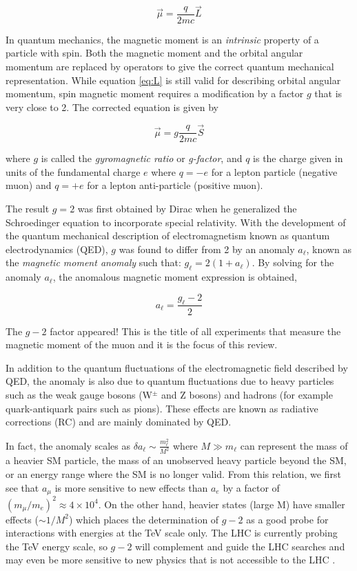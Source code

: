 \documentclass{outhesis}
\begin{document}
\begin{equation}
\overrightarrow{\mu} = \frac{q}{2mc} \overrightarrow{L}
  \label{eq:L}
\end{equation}

In quantum mechanics, the magnetic moment is an \emph{intrinsic} property of a particle with spin. Both the magnetic moment and the orbital angular momentum are replaced by operators to give the correct quantum mechanical representation. While equation \ref{eq:L} is still valid for describing orbital angular momentum, spin magnetic moment requires a modification by a factor $g$ that is very close to 2. The corrected equation is given by

\begin{equation}
\overrightarrow{\mu} = g\frac{q}{2mc}\overrightarrow{S}
\label{eq:mu}
\end{equation}

where $g$ is called the \emph{gyromagnetic ratio} or \emph{g-factor}, and $q$ is the charge given in units of the fundamental charge $e$ where $q = -e$ for a lepton particle (negative muon) and $q = +e$ for a lepton anti-particle (positive muon). 

The result $g = 2$ was first obtained by Dirac when he generalized the Schroedinger equation to incorporate special relativity. With the development of the quantum mechanical description of electromagnetism known as quantum electrodynamics (QED), $g$ was found to differ from 2 by an anomaly $a_\ell$, known as the  \emph{magnetic moment anomaly} such that: $g_\ell = 2(1+a_\ell)$. By solving for the anomaly $a_\ell$, the anomalous magnetic moment expression is obtained,

\begin{equation}
a_{\ell} = \frac{g_\ell-2}{2}
\end{equation}


The $g-2$ factor appeared! This is the title of all experiments that measure the magnetic moment of the muon and it is the focus of this review.

In addition to the quantum fluctuations of the electromagnetic field described by QED, the anomaly is also due to quantum fluctuations due to heavy particles such as the weak gauge bosons (W$^{\pm}$ and Z bosons) and hadrons (for example quark-antiquark pairs such as pions). These effects are known as radiative corrections (RC) and are mainly dominated by QED. 

In fact, the anomaly scales as $\delta a_\ell \sim \frac{m_\ell^2}{M^2}$  where $M \gg m_\ell$ can represent the mass of a heavier SM particle, the mass of an unobserved heavy particle beyond the SM, or an energy range where the SM is no longer valid. From this relation, we first see that $a_{\mu}$ is more sensitive to new effects than $a_e$ by a factor of $\left(m_{\mu}/m_e\right)^2 \approx 4 \times 10^4$. On the other hand, heavier states (large M) have smaller effects ($\sim 1/M^2$) which places the determination of $g-2$ as a good probe for interactions with energies at the TeV scale only. The LHC is currently probing the TeV energy scale, so $g-2$ will complement and guide the LHC searches and may even be more sensitive to new physics that is not accessible to the LHC \cite{doe}. 
\end{document}
